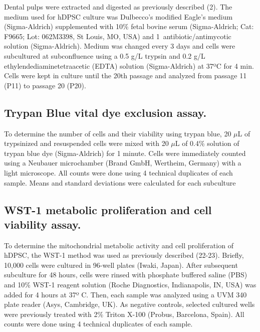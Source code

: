 \documentclass[a4paper,twocolumn,12pt]{article}
\begin{document}
Dental pulps were extracted and digested as previously described (2). The medium used for hDPSC culture was Dulbecco’s modified Eagle’s medium (Sigma-Aldrich) supplemented with 10\% fetal bovine serum (Sigma-Aldrich; Cat: F9665; Lot: 062M3398, St Louis, MO, USA) and 1\ antibiotic/antimycotic solution (Sigma-Aldrich). Medium was changed every 3 days and cells were subcultured at subconfluence using a 0.5 g/L trypsin and 0.2 g/L ethylendediaminetetraacetic (EDTA) solution (Sigma-Aldrich) at 37ºC for 4 min. Cells were kept in culture until the 20th passage and analyzed from passage 11 (P11) to passage 20 (P20).\\
\subsection{Trypan Blue vital dye exclusion assay.}
To determine the number of cells and their viability using trypan blue, 20 $\mu$L of trypsinized and resuspended cells were mixed with 20 $\mu$L of 0.4\% solution of trypan blue dye (Sigma-Aldrich) for 1 minute. Cells were immediately counted using a Neubauer microchamber (Brand GmbH, Wertheim, Germany) with a light microscope. All counts were done using 4 technical duplicates of each sample. Means and standard deviations were calculated for each subculture\\
\subsection{WST-1 metabolic proliferation and cell viability assay.}
To determine the mitochondrial metabolic activity and cell proliferation of hDPSC, the WST-1 method was used as previously described (22-23). Briefly, 10,000 cells were cultured in 96-well plates (Iwaki, Japan). After subsequent subculture for 48 hours, cells were rinsed with phosphate buffered saline (PBS) and 10\% WST-1 reagent solution (Roche Diagnostics, Indianapolis, IN, USA) was added for 4 hours at 37º C. Then, each sample was analyzed using a UVM 340 plate reader (Asys, Cambridge, UK). As negative controls, selected cultured wells were previously treated with 2\% Triton X-100 (Probus, Barcelona, Spain). All counts were done using 4 technical duplicates of each sample.\\
\end{document}
